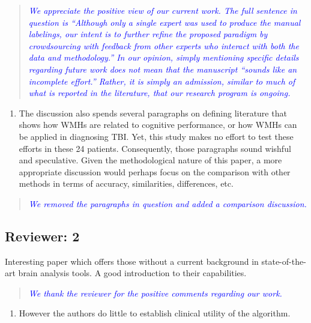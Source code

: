 \documentclass[12pt,]{article}
\providecommand{\tightlist}{%
  \setlength{\itemsep}{0pt}\setlength{\parskip}{0pt}}
\begin{document}
\begin{quote}
\emph{\textcolor{blue}{We appreciate the positive view of our current work.
The full sentence in question is ``Although only a
single expert was used to produce the manual labelings, our intent is to
further refine the proposed paradigm by crowdsourcing with feedback from
other experts who interact with both the data and methodology.''
In our opinion, simply mentioning specific details regarding future work
does not mean that the manuscript ``sounds like an incomplete effort.''
Rather, it is simply an admission, similar to much of what is reported
in the literature, that our research program is ongoing.}}
\end{quote}

\begin{enumerate}
\def\labelenumi{\arabic{enumi}.}
\setcounter{enumi}{14}
\tightlist
\item
  The discussion also spends several paragraphs on defining literature
  that shows how WMHs are related to cognitive performance, or how WMHs
  can be applied in diagnosing TBI. Yet, this study makes no effort to
  test these efforts in these 24 patients. Consequently, those
  paragraphs sound wishful and speculative. Given the methodological
  nature of this paper, a more appropriate discussion would perhaps
  focus on the comparison with other methods in terms of accuracy,
  similarities, differences, etc.
\end{enumerate}

\begin{quote}
\emph{\textcolor{blue}{We removed the paragraphs in question and added a
comparison discussion.}}
\end{quote}

\subsection{Reviewer: 2}\label{reviewer-2}

Interesting paper which offers those without a current background in
state-of-the-art brain analysis tools. A good introduction to their
capabilities.

\begin{quote}
\emph{\textcolor{blue}{We thank the reviewer for the positive comments regarding our work.}}
\end{quote}

\begin{enumerate}
\def\labelenumi{\arabic{enumi}.}
\tightlist
\item
  However the authors do little to establish clinical utility of the
  algorithm.
\end{enumerate}
\end{document}
